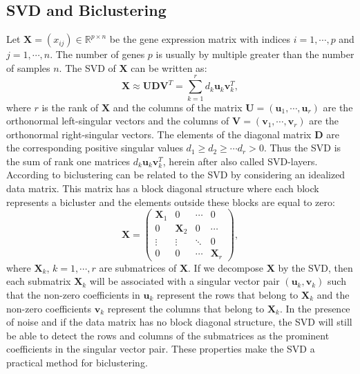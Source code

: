 \subsection{SVD and Biclustering}
Let $\mathbf{X}=(x_{ij}) \in \mathbb{R}^{p \times n}$  be the gene expression matrix with indices $i=1,\cdots,p$ and $j=1,\cdots,n$. The number of genes $p$ is usually by multiple greater than the number of samples $n$. The SVD of $\mathbf{X}$ can be written as:
\begin{equation}
 \mathbf{X} \approx \mathbf{U}\mathbf{D}\mathbf{V}^{T} = \sum_{k=1}^{r}d_{k}\mathbf{u}_{k}\mathbf{v}_{k}^{T},
\end{equation}
where $r$ is the rank of $\mathbf{X}$ and the columns of the matrix $\mathbf{U}=(\mathbf{u}_{1},\cdots,\mathbf{u}_{r})$ are the orthonormal left-singular vectors  and the columns of $\mathbf{V}=(\mathbf{v}_{1},\cdots,\mathbf{v}_{r})$ are the orthonormal right-singular vectors. The elements of the diagonal matrix $\mathbf{D}$ are the corresponding positive singular values $d_{1} \geq d_{2} \geq \cdots d_{r} > 0$. 
Thus the SVD is the sum of rank one matrices $d_{k}\mathbf{u}_{k}\mathbf{v}_{k}^{T}$, herein after also called SVD-layers.
According to \citet{Busygin2008} biclustering can be related to the SVD by considering an idealized data matrix.
This matrix has a block diagonal structure where each block represents a bicluster and the elements outside these blocks are equal to zero:
\begin{equation}
\mathbf{X}=
\begin{pmatrix} 
\mathbf{X}_{1} & 0 & \cdots & 0\\
0 & \mathbf{X}_{2} & 0 & \cdots \\
\vdots  & \vdots  & \ddots  & 0 \\
0 & 0 & \cdots & \mathbf{X}_{r}
\end{pmatrix},
\end{equation}
where $\mathbf{X}_{k}$, $k=1,\cdots,r$ are submatrices of $\mathbf{X}$. If we decompose $\mathbf{X}$ by the SVD, then each submatrix $\mathbf{X}_{k}$ will be associated with a singular vector pair $(\mathbf{u}_{k},\mathbf{v}_{k})$ such that the non-zero coefficients in $\mathbf{u}_{k}$ represent the rows that belong to $\mathbf{X}_{k}$ and the non-zero coefficients $\mathbf{v}_{k}$ represent the columns that belong to $\mathbf{X}_{k}$. In the presence of noise and if the data matrix has no block diagonal structure, the SVD will still be able to detect the rows and columns of the submatrices as the prominent coefficients in the singular vector pair. These properties make the SVD a practical method for biclustering. 

